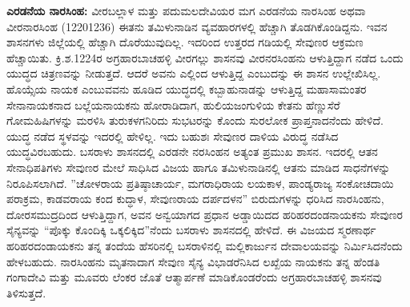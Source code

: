 \textbf{ಎರಡನೆಯ ನಾರಸಿಂಹ:} ವೀರಬಲ್ಲಾಳ ಮತ್ತು ಪದುಮಲದೇವಿಯರ ಮಗ ಎರಡನೆಯ ನಾರಸಿಂಹ ಅಥವಾ ವೀರನಾರಸಿಂಹ (1220\enginline{-}1236) ಈತನು ತಮಿಳುನಾಡಿನ ವ್ಯವಹಾರಗಳಲ್ಲಿ ಹೆಚ್ಚಾಗಿ ತೊಡಗಿಕೊಂಡಿದ್ದನು. ಇವನ ಶಾಸನಗಳು ಜಿಲ್ಲೆಯಲ್ಲಿ ಹೆಚ್ಚಾಗಿ ದೊರೆಯುವುದಿಲ್ಲ. ಇದರಿಂದ ಉತ್ತರದ ಗಡಿಯಲ್ಲಿ ಸೇವುಣರ ಆಕ್ರಮಣ ಹೆಚ್ಚಾಯಿತು. ಕ್ರಿ.ಶ.1224ರ ಅಗ್ರಹಾರಬಾಚಹಳ್ಳಿ ವೀರಗಲ್ಲು ಶಾಸನವು ವೀರನರಸಿಂಹನು ಆಳುತ್ತಿದ್ದಾಗ ನಡೆದ ಒಂದು ಯುದ್ಧದ ಚಿತ್ರಣವನ್ನು ನೀಡುತ್ತದೆ. ಆದರೆ ಅವನು ಎಲ್ಲಿಂದ ಆಳುತ್ತಿದ್ದ ಎಂಬುದನ್ನು ಈ ಶಾಸನ ಉಲ್ಲೇಖಿಸಿಲ್ಲ. ಹೊಯ್ಸೆಯ ನಾಯಕ ಎಂಬು\-ವವನು ಹೂಡಿದ ಯುದ್ಧದಲ್ಲಿ ಕಬ್ಬಾಹುನಾಡನ್ನು ಆಳುತ್ತಿದ್ದ ಮಹಾಸಾಮಂತರ ಸೇನಾನಾಯಕನಾದ ಬಲ್ಲೆಯನಾಯಕನು ಹೋರಾಡಿದಾಗ, ಹುಲಿಯಜಂಗುಳಿಯ ಕೇತನು ಹೆಣ್ಣುಸೆರೆ ಗೋಮಹಿಷಿಗಳನ್ನು ಮರಳಿಸಿ ತುರುಕಳಗನಿರಿದು ಸುಭಟರನ್ನು ಕೊಂದು ಸುರಲೋಕ ಪ್ರಾಪ್ತನಾದನೆಂದು ಹೇಳಿದೆ. ಯುದ್ಧ ನಡೆದ ಸ್ಥಳವನ್ನು ಇದರಲ್ಲಿ ಹೇಳಿಲ್ಲ. ಇದು ಬಹುಶಃ ಸೇವುಣರ ದಾಳಿಯ ವಿರುದ್ಧ ನಡೆಸಿದ ಯುದ್ಧವಿರಬಹುದು. ಬಸರಾಳು ಶಾಸನದಲ್ಲಿ ಎರಡನೇ ನರಸಿಂಹನ ಅತ್ಯಂತ ಪ್ರಮುಖ ಶಾಸನ. ಇದರಲ್ಲಿ ಆತನ ಸೇನಾಧಿಪತಿಗಳು ಸೇವುಣರ ಮೇಲೆ ಸಾಧಿಸಿದ ವಿಜಯ ಹಾಗೂ ತಮಿಳುನಾಡಿನಲ್ಲಿ ಆತನು ಮಾಡಿದ ಸಾಧನೆಗಳನ್ನು ನಿರೂಪಿಸಲಾಗಿದೆ. ''ಚೋಳರಾಯ ಪ್ರತಿಷ್ಠಾಚಾರ್ಯ, ಮಗರಾಧಿರಾಯ ಲಯಕಾಳ, ಪಾಂಡ್ಯರಾಜ್ಯ ಸಂಕೋಚದಾಯಿ ಪರಾಕ್ರಮ, ಕಾಡವರಾಯ ಕಂದ ಕುದ್ಧಾಳ, ಸೇವುಣರಾಯ ದರ್ಪದಳನ'' ಬಿರುದುಗಳನ್ನು ಧರಿಸಿದ ನಾರಸಿಂಹನು, ದೋರಸಮುದ್ರದಿಂದ ಆಳುತ್ತಿದ್ದಾಗ, ಅವನ ಅನ್ವಯಾಗದ ಪ್ರಧಾನ ಅಡ್ಡಾಯಿದದ ಹರಿಹರದಂಡನಾಯಕನು ಸೇವುಣರ ಸೈನ್ಯವನ್ನು “ಪೊಕ್ಕು ಕೊಂದಿಕ್ಕಿ ಒಕ್ಕಲಿಕ್ಕಿದ”ನೆಂದು ಬಸರಾಳು ಶಾಸನದಲ್ಲಿ ಹೇಳಿದೆ. ಈ ವಿಜಯದ ಸ್ಮರಣಾರ್ಥ ಹರಿಹರದಂಡಾಯಕನು ತನ್ನ ತಂದೆಯ ಹೆಸರಿನಲ್ಲಿ ಬಸರಾಳಿನಲ್ಲಿ ಮಲ್ಲಿಕಾರ್ಜುನ ದೇವಾಲಯವನ್ನು ನಿರ್ಮಿಸಿದನೆಂದು ಹೇಳಬಹುದು. ನಾರಸಿಂಹನು ಮೃತನಾದಾಗ ಸೇವುಣ ಸೈನ್ಯ ವಿಭಾಡರೆನಿಸಿದ ಲಖ್ಖೆಯ ನಾಯಕನು ತನ್ನ ಹೆಂಡತಿ ಗಂಗಾದೇವಿ ಮತ್ತು ಮೂವರು ಲೆಂಕರ ಜೊತೆ ಆತ್ಮಾರ್ಪಣೆ ಮಾಡಿಕೊಂಡರೆಂದು ಅಗ್ರಹಾರಬಾಚಹಳ್ಳಿ ಶಾಸನವು ತಿಳಿಸುತ್ತದೆ.

